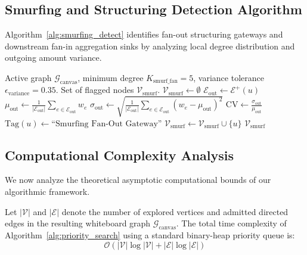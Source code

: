 \subsection{Smurfing and Structuring Detection Algorithm}

Algorithm~\ref{alg:smurfing_detect} identifies fan-out structuring gateways and downstream fan-in aggregation sinks by analyzing local degree distribution and outgoing amount variance.

\begin{algorithm}[H]
\caption{Smurfing / Structuring Detection Procedure}
\label{alg:smurfing_detect}
\begin{algorithmic}[1]
\Require Active graph $\mathcal{G}_{\text{canvas}}$, minimum degree $K_{\text{smurf\_fan}} = 5$, variance tolerance $\epsilon_{\text{variance}} = 0.35$.
\Ensure Set of flagged nodes $\mathcal{V}_{\text{smurf}}$.
\State $\mathcal{V}_{\text{smurf}} \gets \emptyset$
    \State $\mathcal{E}_{\text{out}} \gets \mathcal{E}^+(u)$
        \State $\mu_{\text{out}} \gets \frac{1}{|\mathcal{E}_{\text{out}}|} \sum_{e \in \mathcal{E}_{\text{out}}} w_e$
        \State $\sigma_{\text{out}} \gets \sqrt{\frac{1}{|\mathcal{E}_{\text{out}}|} \sum_{e \in \mathcal{E}_{\text{out}}} (w_e - \mu_{\text{out}})^2}$
        \State $\text{CV} \gets \frac{\sigma_{\text{out}}}{\mu_{\text{out}}}$
            \State $\text{Tag}(u) \gets \text{``Smurfing Fan-Out Gateway''}$
            \State $\mathcal{V}_{\text{smurf}} \gets \mathcal{V}_{\text{smurf}} \cup \{u\}$
        \EndIf
    \EndIf
\EndFor
\State \Return $\mathcal{V}_{\text{smurf}}$
\end{algorithmic}
\end{algorithm}

\subsection{Computational Complexity Analysis}

We now analyze the theoretical asymptotic computational bounds of our algorithmic framework.

\begin{theorem}
\label{thm:time_complexity}
Let $|\mathcal{V}|$ and $|\mathcal{E}|$ denote the number of explored vertices and admitted directed edges in the resulting whiteboard graph $\mathcal{G}_{\text{canvas}}$. The total time complexity of Algorithm~\ref{alg:priority_search} using a standard binary-heap priority queue is:
\begin{equation}
    \mathcal{O}(|\mathcal{V}| \log |\mathcal{V}| + |\mathcal{E}| \log |\mathcal{E}|)
\end{equation}
\end{theorem}

